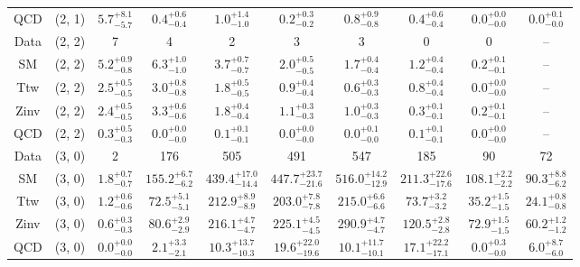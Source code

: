 \begin{table}[h!]
{\begin{tabular}{cccccccccc}
	QCD & (2, 1) & $5.7^{+ 8.1 }_{- 5.7 }$ & $0.4^{+ 0.6 }_{- 0.4 }$ & $1.0^{+ 1.4 }_{- 1.0 }$ & $0.2^{+ 0.3 }_{- 0.2 }$ & $0.8^{+ 0.9 }_{- 0.8 }$ & $0.4^{+ 0.6 }_{- 0.4 }$ & $0.0^{+ 0.0 }_{- 0.0 }$ & $0.0^{+ 0.1 }_{- 0.0 }$ \\[0.5ex] 
	Data & (2, 2) & 7 & 4 & 2 & 3 & 3 & 0 & 0 & -- \\[0.5ex] 
	SM & (2, 2) & $5.2^{+ 0.9 }_{- 0.8 }$ & $6.3^{+ 1.0 }_{- 1.0 }$ & $3.7^{+ 0.7 }_{- 0.7 }$ & $2.0^{+ 0.5 }_{- 0.5 }$ & $1.7^{+ 0.4 }_{- 0.4 }$ & $1.2^{+ 0.4 }_{- 0.4 }$ & $0.2^{+ 0.1 }_{- 0.1 }$ & -- \\[0.5ex] 
	Ttw & (2, 2) & $2.5^{+ 0.5 }_{- 0.5 }$ & $3.0^{+ 0.8 }_{- 0.8 }$ & $1.8^{+ 0.5 }_{- 0.5 }$ & $0.9^{+ 0.4 }_{- 0.4 }$ & $0.6^{+ 0.3 }_{- 0.3 }$ & $0.8^{+ 0.4 }_{- 0.4 }$ & $0.0^{+ 0.0 }_{- 0.0 }$ & -- \\[0.5ex] 
	Zinv & (2, 2) & $2.4^{+ 0.5 }_{- 0.5 }$ & $3.3^{+ 0.6 }_{- 0.6 }$ & $1.8^{+ 0.4 }_{- 0.4 }$ & $1.1^{+ 0.3 }_{- 0.3 }$ & $1.0^{+ 0.3 }_{- 0.3 }$ & $0.3^{+ 0.1 }_{- 0.1 }$ & $0.2^{+ 0.1 }_{- 0.1 }$ & -- \\[0.5ex] 
	QCD & (2, 2) & $0.3^{+ 0.5 }_{- 0.3 }$ & $0.0^{+ 0.0 }_{- 0.0 }$ & $0.1^{+ 0.1 }_{- 0.1 }$ & $0.0^{+ 0.0 }_{- 0.0 }$ & $0.0^{+ 0.1 }_{- 0.0 }$ & $0.1^{+ 0.1 }_{- 0.1 }$ & $0.0^{+ 0.0 }_{- 0.0 }$ & -- \\[0.5ex] 
	Data & (3, 0) & 2 & 176 & 505 & 491 & 547 & 185 & 90 & 72 \\[0.5ex] 
	SM & (3, 0) & $1.8^{+ 0.7 }_{- 0.7 }$ & $155.2^{+ 6.7 }_{- 6.2 }$ & $439.4^{+ 17.0 }_{- 14.4 }$ & $447.7^{+ 23.7 }_{- 21.6 }$ & $516.0^{+ 14.2 }_{- 12.9 }$ & $211.3^{+ 22.6 }_{- 17.6 }$ & $108.1^{+ 2.2 }_{- 2.2 }$ & $90.3^{+ 8.8 }_{- 6.2 }$ \\[0.5ex] 
	Ttw & (3, 0) & $1.2^{+ 0.6 }_{- 0.6 }$ & $72.5^{+ 5.1 }_{- 5.1 }$ & $212.9^{+ 8.9 }_{- 8.9 }$ & $203.0^{+ 7.8 }_{- 7.8 }$ & $215.0^{+ 6.6 }_{- 6.6 }$ & $73.7^{+ 3.2 }_{- 3.2 }$ & $35.2^{+ 1.5 }_{- 1.5 }$ & $24.1^{+ 0.8 }_{- 0.8 }$ \\[0.5ex] 
	Zinv & (3, 0) & $0.6^{+ 0.3 }_{- 0.3 }$ & $80.6^{+ 2.9 }_{- 2.9 }$ & $216.1^{+ 4.7 }_{- 4.7 }$ & $225.1^{+ 4.5 }_{- 4.5 }$ & $290.9^{+ 4.7 }_{- 4.7 }$ & $120.5^{+ 2.8 }_{- 2.8 }$ & $72.9^{+ 1.5 }_{- 1.5 }$ & $60.2^{+ 1.2 }_{- 1.2 }$ \\[0.5ex] 
	QCD & (3, 0) & $0.0^{+ 0.0 }_{- 0.0 }$ & $2.1^{+ 3.3 }_{- 2.1 }$ & $10.3^{+ 13.7 }_{- 10.3 }$ & $19.6^{+ 22.0 }_{- 19.6 }$ & $10.1^{+ 11.7 }_{- 10.1 }$ & $17.1^{+ 22.2 }_{- 17.1 }$ & $0.0^{+ 0.3 }_{- 0.0 }$ & $6.0^{+ 8.7 }_{- 6.0 }$ \\[0.5ex] 

\end{tabular}}
\end{table}
